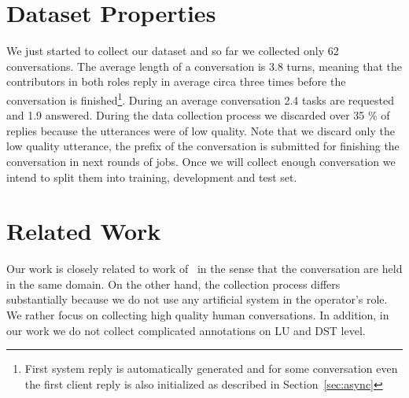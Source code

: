 \documentclass[runningheads,a4paper]{llncs}
\def\OP#1{#1}  %
\begin{document}
\section{Dataset Properties} \label{sec:props}
\vspace{-0.50em}
We just started to collect our dataset and so far we collected only \OP{62} conversations.
The average length of a conversation is \OP{3.8} turns, meaning that the contributors in both roles reply in average circa three times before the conversation is finished\footnote{First system reply is automatically generated and for some conversation even the first client reply is also initialized as described in Section~\ref{sec:async}}.
During an average conversation \OP{2.4} tasks are requested and \OP{1.9} answered.
During the data collection process we discarded over \OP{35} \% of replies because the utterances were of low quality.
Note that we discard only the low quality utterance, the prefix of the conversation is submitted for finishing the conversation in next rounds of jobs.
Once we will collect enough conversation we intend to split them into training, development and test set. %


\section{Related Work} \label{sec:related}
\vspace{-0.50em}
Our work is closely related  to work of~\cite{williams2013dstc1,henderson2014dstc2,henderson2014dstc3} in the sense that the conversation are held in the same domain.
On the other hand, the collection process differs substantially because we do not use any artificial system in the operator's role.  
We rather focus on collecting high quality human conversations. 
In addition, in our work we do not collect complicated annotations on LU and DST level.
\end{document}
